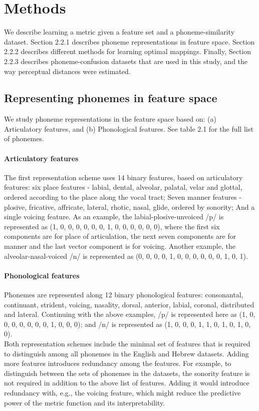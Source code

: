\section{Methods}
We describe learning a metric given a feature set and a phoneme-similarity dataset. Section 2.2.1 describes phoneme representations in feature space. Section 2.2.2 describes different methods for learning optimal mappings. Finally, Section 2.2.3 describes phoneme-confusion datasets that are used in this study, and the way perceptual distances were estimated.

\subsection{Representing phonemes in feature space}
We study phoneme representations in the feature space based on: (a) Articulatory features, and (b) Phonological features. See table 2.1 for the full list of phonemes.

\paragraph{Articulatory features} The first representation scheme uses 14 binary features, based on articulatory features: six place features - labial, dental, alveolar, palatal, velar and glottal, ordered according to the place along the vocal tract; Seven manner features - plosive, fricative, affricate, lateral, rhotic, nasal, glide, ordered by sonority; And a single voicing feature. As an example, the labial-plosive-unvoiced /p/ is represented  as (1, 0, 0, 0, 0, 0, 0, 1, 0, 0, 0, 0, 0, 0), where the first six components are for place of articulation, the next seven components are for manner and the last vector component is for voicing. Another example, the alveolar-nasal-voiced /n/ is represented as (0, 0, 0, 0, 1, 0, 0, 0, 0, 0, 0, 1, 0, 1).

\paragraph{Phonological features} Phonemes are represented along 12 binary phonological features: consonantal, continuant, strident, voicing, nasality, dorsal, anterior, labial, coronal, distributed and lateral. Continuing with the above examples, /p/ is represented here as (1, 0, 0, 0, 0, 0, 0, 0, 1, 0, 0, 0); and /n/ is represented as (1, 0, 0, 0, 1, 1, 0, 1, 0, 1, 0, 0). \mbox{} \\

Both representation schemes include the minimal set of features that is required to distinguish among all phonemes in the English and Hebrew datasets. Adding more features introduces redundancy among the features. For example, to distinguish between the sets of phonemes in the datasets, the sonority feature is not required in addition to the above list of features. Adding it would introduce redundancy with, e.g., the voicing feature, which might reduce the predictive power of the metric function and its interpretability.


